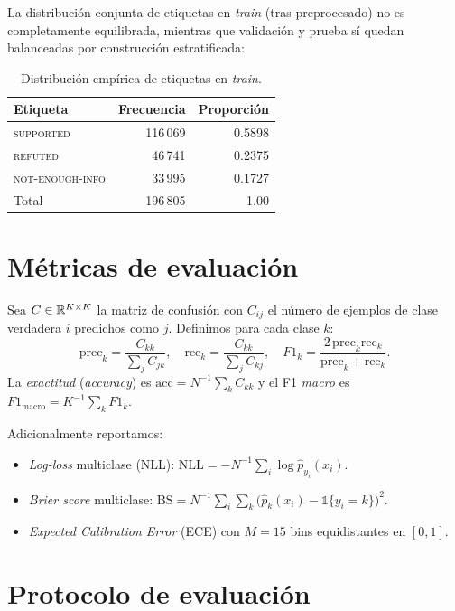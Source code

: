 La distribución conjunta de etiquetas en \emph{train} (tras
preprocesado) no es completamente equilibrada, mientras que validación
y prueba sí quedan balanceadas por construcción estratificada:
\begin{table}[h]
  \centering
  \begin{tabular}{lrr}
    \toprule
    Etiqueta & Frecuencia & Proporción \\
    \midrule
    \textsc{supported}        & 116\,069 & 0.5898 \\
    \textsc{refuted}          & 46\,741  & 0.2375 \\
    \textsc{not-enough-info}  & 33\,995  & 0.1727 \\
    \midrule
    Total & 196\,805 & 1.00 \\
    \bottomrule
  \end{tabular}
  \caption{Distribución empírica de etiquetas en \emph{train}.}
  \label{tab:fever-dist}
\end{table}

\section{Métricas de evaluación}

Sea $C \in \mathbb{R}^{K \times K}$ la matriz de confusión con
$C_{ij}$ el número de ejemplos de clase verdadera $i$ predichos como
$j$. Definimos para cada clase $k$:
\[
  \mathrm{prec}_k = \frac{C_{kk}}{\sum_j C_{jk}}, \quad
  \mathrm{rec}_k = \frac{C_{kk}}{\sum_j C_{kj}}, \quad
  F1_k = \frac{2\,\mathrm{prec}_k \mathrm{rec}_k}{\mathrm{prec}_k + \mathrm{rec}_k}.
\]
La \emph{exactitud} (\emph{accuracy}) es
$\mathrm{acc} = N^{-1} \sum_k C_{kk}$ y el F1 \emph{macro} es
$F1_{\text{macro}} = K^{-1} \sum_k F1_k$.

Adicionalmente reportamos:
\begin{itemize}[leftmargin=*,itemsep=0.2em]
  \item \emph{Log-loss} multiclase (NLL):
        $\mathrm{NLL} = -N^{-1} \sum_i \log \hat{p}_{y_i}(x_i)$.
  \item \emph{Brier score} multiclase:
        $\mathrm{BS} = N^{-1} \sum_i \sum_k
        \bigl(\hat{p}_k(x_i) - \mathbb{1}\{y_i = k\}\bigr)^2$.
  \item \emph{Expected Calibration Error} (ECE) con $M = 15$ bins
        equidistantes en $[0, 1]$.
\end{itemize}

\section{Protocolo de evaluación}

